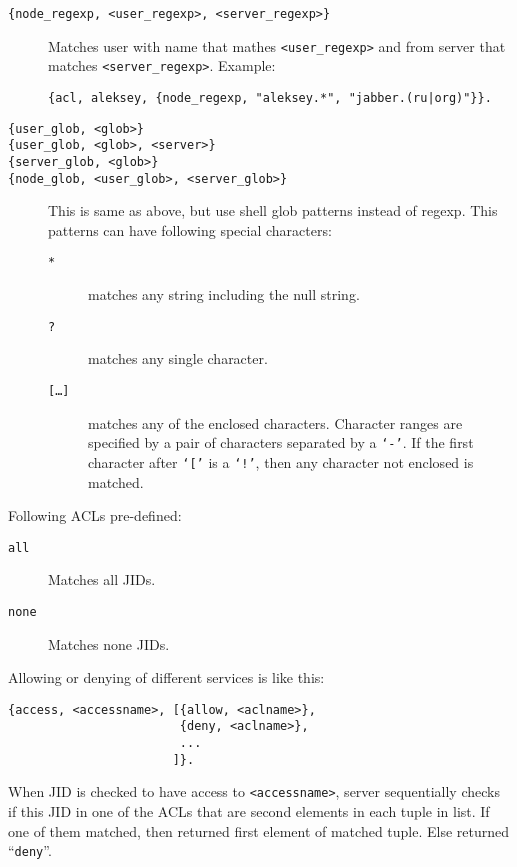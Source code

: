 \documentclass[10pt]{article}
\begin{document}
\begin{description}
\item[\texttt{\{node\_regexp, <user\_regexp>, <server\_regexp>\}}] Matches user
  with name that mathes \texttt{<user\_regexp>} and from server that matches
  \texttt{<server\_regexp>}.  Example:
\begin{verbatim}
{acl, aleksey, {node_regexp, "aleksey.*", "jabber.(ru|org)"}}.
\end{verbatim}

\item[\texttt{\{user\_glob, <glob>\}}]
\item[\texttt{\{user\_glob, <glob>, <server>\}}]
\item[\texttt{\{server\_glob, <glob>\}}]
\item[\texttt{\{node\_glob, <user\_glob>, <server\_glob>\}}] This is same as
  above, but use shell glob patterns instead of regexp.  This patterns can have
  following special characters:
  \begin{description}
  \item[\texttt{*}] matches any string including the null string.
  \item[\texttt{?}] matches any single character.
  \item[\texttt{[\ldots{}]}] matches any of the enclosed characters.  Character
    ranges are specified by a pair of characters separated by a \texttt{`-'}.
    If the first character after \texttt{`['} is a \texttt{`!'}, then any
    character not enclosed is matched.
  \end{description}
\end{description}

Following ACLs pre-defined:
\begin{description}
\item[\texttt{all}] Matches all JIDs.
\item[\texttt{none}] Matches none JIDs.
\end{description}

Allowing or denying of different services is like this:
\begin{verbatim}
{access, <accessname>, [{allow, <aclname>},
                        {deny, <aclname>},
                        ...
                       ]}.
\end{verbatim}
When JID is checked to have access to \texttt{<accessname>}, server
sequentially checks if this JID in one of the ACLs that are second elements in
each tuple in list.  If one of them matched, then returned first element of
matched tuple.  Else returned ``\texttt{deny}''.
\end{document}
